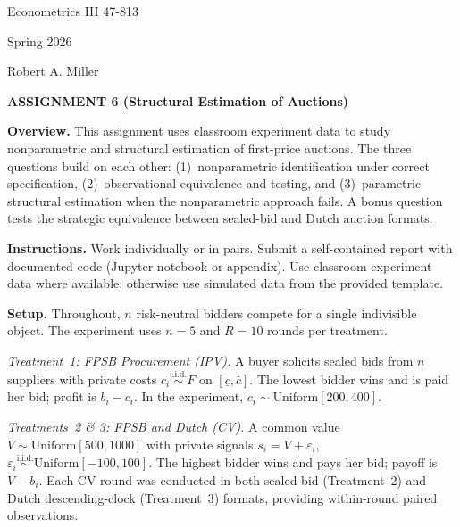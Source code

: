 \documentclass[11pt]{article}
\begin{document}
\begin{flushright}
Econometrics III 47-813

Spring 2026

Robert A. Miller
\end{flushright}

\begin{center}
\textbf{ASSIGNMENT 6 (Structural Estimation of Auctions)}
\end{center}

\vspace{0.3cm}

\noindent \textbf{Overview.}
This assignment uses classroom experiment data to study nonparametric and structural estimation of first-price auctions. The three questions build on each other: (1)~nonparametric identification under correct specification, (2)~observational equivalence and testing, and (3)~parametric structural estimation when the nonparametric approach fails. A bonus question tests the strategic equivalence between sealed-bid and Dutch auction formats.

\vspace{0.2cm}

\noindent \textbf{Instructions.}
Work individually or in pairs. Submit a self-contained report with documented code (Jupyter notebook or appendix). Use classroom experiment data where available; otherwise use simulated data from the provided template.

\vspace{0.4cm}

\noindent\textbf{Setup.}
Throughout, $n$ risk-neutral bidders compete for a single indivisible object. The experiment uses $n = 5$ and $R = 10$ rounds per treatment.

\medskip

\noindent\textit{Treatment~1: FPSB Procurement (IPV).}
A buyer solicits sealed bids from $n$ suppliers with private costs $c_i \stackrel{\text{i.i.d.}}{\sim} F$ on $[\underline{c}, \bar{c}]$. The lowest bidder wins and is paid her bid; profit is $b_i - c_i$. In the experiment, $c_i \sim \text{Uniform}[200, 400]$.

\medskip

\noindent\textit{Treatments~2 \& 3: FPSB and Dutch (CV).}
A common value $V \sim \text{Uniform}[500, 1000]$ with private signals $s_i = V + \varepsilon_i$, $\varepsilon_i \stackrel{\text{i.i.d.}}{\sim} \text{Uniform}[-100, 100]$. The highest bidder wins and pays her bid; payoff is $V - b_i$. Each CV round was conducted in both sealed-bid (Treatment~2) and Dutch descending-clock (Treatment~3) formats, providing within-round paired observations.
\end{document}
